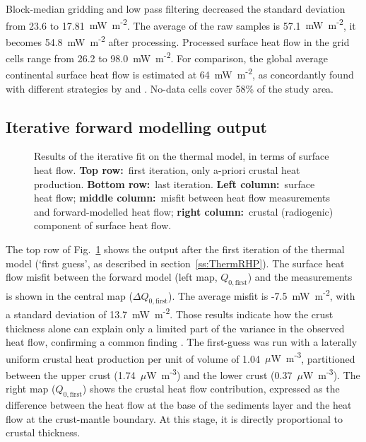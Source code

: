 {Block-median gridding and low pass filtering decreased the standard deviation from 23.6 to 17.81~{mW~m\textsuperscript{-2}}.
The average of the raw samples is 57.1~{mW~m\textsuperscript{-2}}, it becomes 54.8~{mW~m\textsuperscript{-2}} after processing.
Processed surface heat flow in the grid cells range from 26.2 to 98.0~{mW~m\textsuperscript{-2}}.
For comparison, the global average continental surface heat flow is estimated at 64~{mW~m\textsuperscript{-2}}, as concordantly found with different strategies by \textcite{Davies2010} and \textcite{Pollack1993}.
No-data cells cover 58\% of the study area.

\subsection{Iterative forward modelling output}
\label{ss:Appl:DiscTherm:FWD}

\begin{figure}
	\begin{adjustbox}{center}
	\end{adjustbox}
	\caption{Results of the iterative fit on the thermal model, in terms of surface heat flow. \textbf{Top row:}~first iteration, only a-priori crustal heat production. \textbf{Bottom row:}~last iteration. \textbf{Left column:}~surface heat flow; \textbf{middle column:}~misfit between heat flow measurements and forward-modelled heat flow; \textbf{right column:}~crustal (radiogenic) component of surface heat flow.}
	\label{fig:Qresults}
\end{figure}

The top row of Fig.~\ref{fig:Qresults} shows the output after the first iteration of the thermal model (`first guess', as described in section~\ref{ss:ThermRHP}).
The surface heat flow misfit between the forward model (left map, $Q_{0,\mathrm{first}}$) and the measurements is shown in the central map ($\Delta Q_{0,\mathrm{first}}$).
The average misfit is -7.5~{mW~m\textsuperscript{-2}}, with a standard deviation of 13.7~{mW~m\textsuperscript{-2}}.
Those results indicate how the crust thickness alone can explain only a limited part of the variance in the observed heat flow, confirming a common finding \parencite[e.g. ][]{Jaupart2016}.
The first-guess was run with a laterally uniform crustal heat production per unit of volume of 1.04~{$\mu$W~m\textsuperscript{-3}}, partitioned between the upper crust (1.74~{$\mu$W~m\textsuperscript{-3}}) and the lower crust (0.37~{$\mu$W~m\textsuperscript{-3}}).
The right map ($Q_{0,\mathrm{first}}$) shows the crustal heat flow contribution, expressed as the difference between the heat flow at the base of the sediments layer and the heat flow at the crust-mantle boundary. 
At this stage, it is directly proportional to crustal thickness.

}
